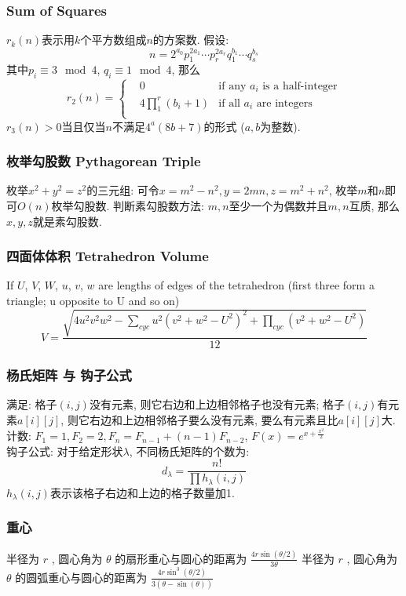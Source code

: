 \begin{small}
\subsubsection{Sum of Squares}
$r_k(n)$表示用$k$个平方数组成$n$的方案数. 假设: 
\[n=2^{a_0}p_1^{2a_1}\cdots p_r^{2a_r}q_1^{b_1}\cdots q_s^{b_s}\]
其中$p_i\equiv 3 \mod 4$, $q_i\equiv 1 \mod 4$, 那么
\[r_2(n)=\left\{\begin{aligned}
& 0 & \text{if any }a_i\text{ is a half-integer}\\
& 4\prod_1^r(b_i+1) & \text{if all }a_i\text{ are integers}\\
\end{aligned}\right.\]
$r_3(n)>0$当且仅当$n$不满足$4^a(8b+7)$的形式 ($a,b$为整数).
\subsubsection{枚举勾股数 Pythagorean Triple}
枚举$x^2+y^2=z^2$的三元组: 可令$x=m^2-n^2,y=2mn,z=m^2+n^2$, 枚举$m$和$n$即可$O(n)$枚举勾股数. 判断素勾股数方法: $m,n$至少一个为偶数并且$m,n$互质, 那么$x,y,z$就是素勾股数.
\subsubsection{四面体体积 Tetrahedron Volume}
If $U$, $V$, $W$, $u$, $v$, $w$ are lengths of edges of the tetrahedron (first three form a triangle; u opposite to U and so on)
\[ V = \frac{\sqrt{ 4u^2v^2w^2 - \sum_{cyc}{u^2(v^2+w^2-U^2)^2} + \prod_{cyc}{(v^2+w^2-U^2)} }}{12} \]
\subsubsection{杨氏矩阵 与 钩子公式}
满足: 格子$(i,j)$没有元素, 则它右边和上边相邻格子也没有元素; 格子$(i,j)$有元素$a[i][j]$, 则它右边和上边相邻格子要么没有元素, 要么有元素且比$a[i][j]$大.\\
计数: $F_1=1,F_2=2,F_n=F_{n-1}+(n-1)F_{n-2}$, $F(x)=e^{x+\frac{x^2}{2}}$\\
钩子公式: 对于给定形状$\lambda$, 不同杨氏矩阵的个数为:
\[d_\lambda=\frac{n!}{\prod h_\lambda(i,j)}\]
$h_\lambda(i,j)$表示该格子右边和上边的格子数量加1. 
\subsubsection{重心}
半径为 $r$ , 圆心角为 $\theta$ 的扇形重心与圆心的距离为 $\frac{4r\sin(\theta/2)}{3\theta}$ 
半径为 $r$ , 圆心角为 $\theta$ 的圆弧重心与圆心的距离为 $\frac{4r\sin^3(\theta/2)}{3(\theta-\sin(\theta))}$


\end{small}
